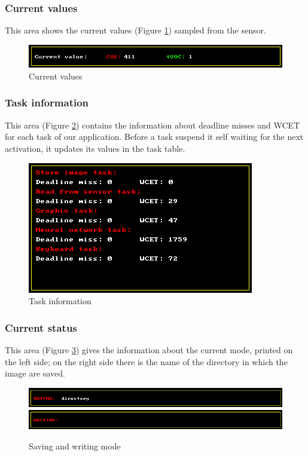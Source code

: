 \documentclass[12pt]{article}
\begin{document}
\subsubsection*{Current values}
This area shows the current values (Figure \ref{values}) sampled from the sensor.

\begin{figure}[H]
    \centering
    \includegraphics[scale=0.75]{images/values.png}
    \caption{Current values}
    \label{values}
\end{figure}

\subsubsection*{Task information}
This area (Figure \ref{task_info}) contains the information about deadline
misses and WCET for each task of our application. Before a task suspend it self
waiting for the next activation, it updates its values in the task table.

\begin{figure}[H]
    \centering
    \includegraphics[scale=0.75]{images/task_info.png}
    \caption{Task information}
    \label{task_info}
\end{figure}

\subsubsection*{Current status}
This area (Figure \ref{save_write}) gives the information about the current
mode, printed on the left side; on the right side there is the name of the
directory in which the image are saved.

\begin{figure}[H]
    \centering
    \includegraphics[scale=0.75]{images/saving.png}
    \includegraphics[scale=0.75]{images/writing.png}
    \caption{Saving and writing mode}
    \label{save_write}
\end{figure}
\end{document}
